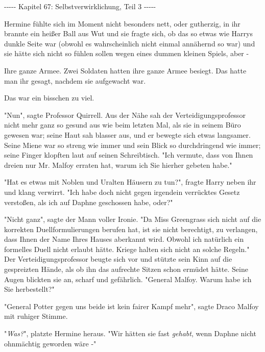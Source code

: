 

\hypertarget{selbstverwirklichung-teil-3}{%

-\/-\/-\/-\/- Kapitel 67: Selbstverwirklichung, Teil 3 -\/-\/-\/-\/-

Hermine fühlte sich im Moment nicht besonders nett, oder gutherzig, in ihr brannte ein heißer Ball aus Wut und sie fragte sich, ob das so etwas wie Harrys dunkle Seite war (obwohl es wahrscheinlich nicht einmal annähernd so war) und sie hätte sich nicht so fühlen sollen wegen eines dummen kleinen Spiels, aber -

Ihre ganze Armee. Zwei Soldaten hatten ihre ganze Armee besiegt. Das hatte man ihr gesagt, nachdem sie aufgewacht war.

Das war ein bisschen zu viel.

"Nun", sagte Professor Quirrell. Aus der Nähe sah der Verteidigungsprofessor nicht mehr ganz so gesund aus wie beim letzten Mal, als sie in seinem Büro gewesen war; seine Haut sah blasser aus, und er bewegte sich etwas langsamer. Seine Miene war so streng wie immer und sein Blick so durchdringend wie immer; seine Finger klopften laut auf seinen Schreibtisch. "Ich vermute, dass von Ihnen dreien nur Mr. Malfoy erraten hat, warum ich Sie hierher gebeten habe."

"Hat es etwas mit Noblen und Uralten Häusern zu tun?", fragte Harry neben ihr und klang verwirrt. "Ich habe doch nicht gegen irgendein verrücktes Gesetz verstoßen, als ich auf Daphne geschossen habe, oder?"

"Nicht ganz", sagte der Mann voller Ironie. "Da Miss Greengrass sich nicht auf die korrekten Duellformulierungen berufen hat, ist sie nicht berechtigt, zu verlangen, dass Ihnen der Name Ihres Hauses aberkannt wird. Obwohl ich natürlich ein formelles Duell nicht erlaubt hätte. Kriege halten sich nicht an solche Regeln." Der Verteidigungsprofessor beugte sich vor und stützte sein Kinn auf die gespreizten Hände, als ob ihn das aufrechte Sitzen schon ermüdet hätte. Seine Augen blickten sie an, scharf und gefährlich. "General Malfoy. Warum habe ich Sie herbestellt?"

"General Potter gegen uns beide ist kein fairer Kampf mehr", sagte Draco Malfoy mit ruhiger Stimme.

"\emph{Was?}", platzte Hermine heraus. "Wir hätten sie fast \emph{gehabt}, wenn Daphne nicht ohnmächtig geworden wäre -"

}
